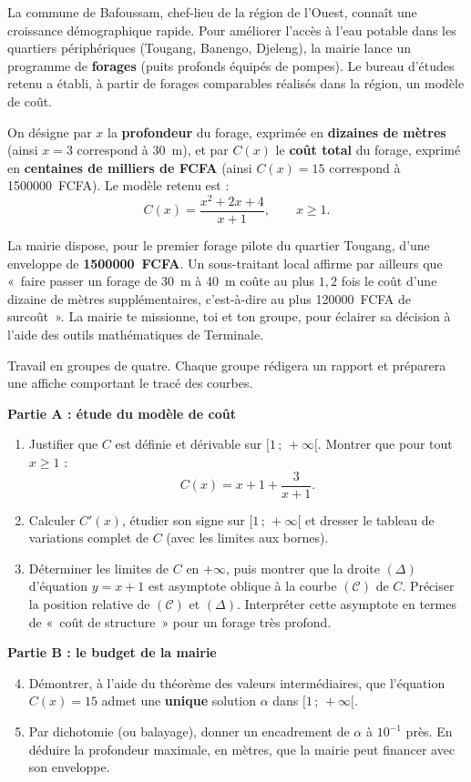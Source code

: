 \documentclass[11pt]{article}
\newcommand{\cle}[1]{{\popxbold\color{popdark}#1}}
\newcounter{popsec}
\newcounter{popsub}
\newcommand{\courssub}[1]{%
  \stepcounter{popsub}%
  \par\vspace{9pt}\noindent{\popxbold\fontsize{11.5}{13}\selectfont\color{popink}{\color{poporange}\thepopsec.\thepopsub}\hspace{6pt}#1}\par\nopagebreak\vspace{4pt}
}
\begin{document}
La commune de Bafoussam, chef-lieu de la région de l'Ouest, connaît une croissance démographique rapide. Pour améliorer l'accès à l'eau potable dans les quartiers périphériques (Tougang, Banengo, Djeleng), la mairie lance un programme de \textbf{forages} (puits profonds équipés de pompes). Le bureau d'études retenu a établi, à partir de forages comparables réalisés dans la région, un modèle de coût.

On désigne par $x$ la \textbf{profondeur} du forage, exprimée en \textbf{dizaines de mètres} (ainsi $x=3$ correspond à \SI{30}{m}), et par $C(x)$ le \textbf{coût total} du forage, exprimé en \textbf{centaines de milliers de FCFA} (ainsi $C(x)=15$ correspond à \num{1500000}~FCFA). Le modèle retenu est :
\[ C(x)=\dfrac{x^{2}+2x+4}{x+1},\qquad x\geq 1. \]

La mairie dispose, pour le premier forage pilote du quartier Tougang, d'une enveloppe de \textbf{\num{1500000}~FCFA}. Un sous-traitant local affirme par ailleurs que «~faire passer un forage de \SI{30}{m} à \SI{40}{m} coûte au plus $1{,}2$ fois le coût d'une dizaine de mètres supplémentaires, c'est-à-dire au plus \num{120000}~FCFA de surcoût~». La mairie te missionne, toi et ton groupe, pour éclairer sa décision à l'aide des outils mathématiques de Terminale.

\courssub{Consignes}

Travail en groupes de quatre. Chaque groupe rédigera un rapport et préparera une affiche comportant le tracé des courbes.

\textbf{Partie A : étude du modèle de coût}
\begin{enumerate}
\item Justifier que $C$ est définie et dérivable sur $[1\,;\,+\infty[$. Montrer que pour tout $x\geq 1$ :
\[ C(x)=x+1+\dfrac{3}{x+1}. \]
\item Calculer $C'(x)$, étudier son signe sur $[1\,;\,+\infty[$ et dresser le tableau de variations complet de $C$ (avec les limites aux bornes).
\item Déterminer les limites de $C$ en $+\infty$, puis montrer que la droite $(\Delta)$ d'équation $y=x+1$ est \cle{asymptote oblique} à la courbe $(\mathcal{C})$ de $C$. Préciser la position relative de $(\mathcal{C})$ et $(\Delta)$. Interpréter cette asymptote en termes de «~coût de structure~» pour un forage très profond.
\end{enumerate}

\textbf{Partie B : le budget de la mairie}
\begin{enumerate}
\setcounter{enumi}{3}
\item Démontrer, à l'aide du théorème des valeurs intermédiaires, que l'équation $C(x)=15$ admet une \textbf{unique} solution $\alpha$ dans $[1\,;\,+\infty[$.
\item Par dichotomie (ou balayage), donner un encadrement de $\alpha$ à $10^{-1}$ près. En déduire la profondeur maximale, en mètres, que la mairie peut financer avec son enveloppe.
\end{enumerate}
\end{document}

